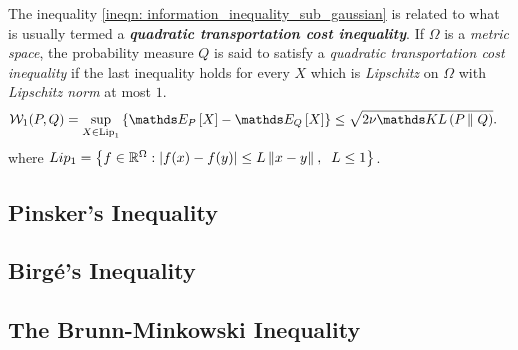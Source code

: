 \documentclass[11pt]{article}
\begin{document}
\begin{itemize}
\begin{remark}
The inequality  \eqref{ineqn: information_inequality_sub_gaussian} is related to what is usually termed a \emph{\textbf{quadratic transportation cost inequality}}. If $\Omega$ is a \emph{metric space}, the probability measure $Q$ is said to satisfy a \emph{quadratic transportation cost inequality} if the last inequality holds for every $X$ which is \emph{Lipschitz} on $\Omega$ with \emph{Lipschitz norm} at most $1$. 
\begin{align}
\cW_1(P, Q) = \sup_{X \in \text{Lip}_1}\set{\E{P}{X} - \E{Q}{X} } &\le \sqrt{2\nu\kl{P}{Q}}. \label{ineqn: information_inequality_sub_gaussian_wasserstein}
\end{align} where $Lip_1 = \left\{f \in {\mathbb R}^{\Omega}: \left\lvert f(x) - f(y) \right\rvert \le L\left\|x - y\right\|_{}, \;\; L\le 1\right\}$.
\end{remark}
\end{itemize}

\subsection{Pinsker's Inequality}

\subsection{Birg{\'e}'s Inequality}

\subsection{The Brunn-Minkowski Inequality}
\newpage


\end{document}
